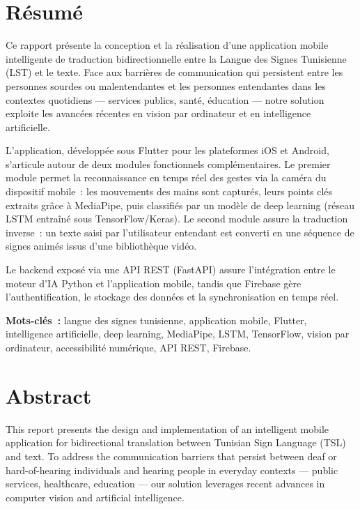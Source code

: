 \documentclass[12pt,fleqn,a4paper]{report}
\begin{document}
\chapter*{Résumé}

Ce rapport présente la conception et la réalisation d'une application mobile intelligente de traduction bidirectionnelle entre la Langue des Signes Tunisienne (LST) et le texte. Face aux barrières de communication qui persistent entre les personnes sourdes ou malentendantes et les personnes entendantes dans les contextes quotidiens — services publics, santé, éducation — notre solution exploite les avancées récentes en vision par ordinateur et en intelligence artificielle.

L'application, développée sous Flutter pour les plateformes iOS et Android, s'articule autour de deux modules fonctionnels complémentaires. Le premier module permet la reconnaissance en temps réel des gestes via la caméra du dispositif mobile~: les mouvements des mains sont capturés, leurs points clés extraits grâce à MediaPipe, puis classifiés par un modèle de deep learning (réseau LSTM entraîné sous TensorFlow/Keras). Le second module assure la traduction inverse~: un texte saisi par l'utilisateur entendant est converti en une séquence de signes animés issus d'une bibliothèque vidéo.

Le backend exposé via une API REST (FastAPI) assure l'intégration entre le moteur d'IA Python et l'application mobile, tandis que Firebase gère l'authentification, le stockage des données et la synchronisation en temps réel.

\bigskip
\textbf{Mots-clés~:} langue des signes tunisienne, application mobile, Flutter, intelligence artificielle, deep learning, MediaPipe, LSTM, TensorFlow, vision par ordinateur, accessibilité numérique, API REST, Firebase.

\chapter*{Abstract}

This report presents the design and implementation of an intelligent mobile application for bidirectional translation between Tunisian Sign Language (TSL) and text. To address the communication barriers that persist between deaf or hard-of-hearing individuals and hearing people in everyday contexts — public services, healthcare, education — our solution leverages recent advances in computer vision and artificial intelligence.
\end{document}

